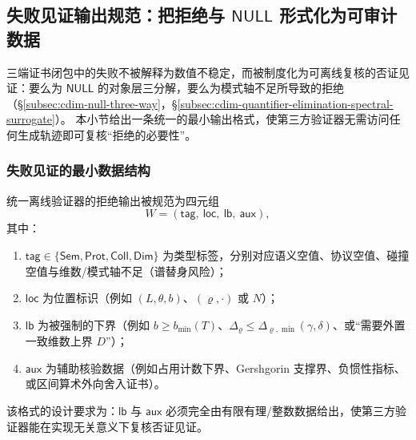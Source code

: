\subsection{失败见证输出规范：把拒绝与 \texorpdfstring{$\mathsf{NULL}$}{NULL} 形式化为可审计数据}\label{subsec:cdim-failure-witness-output-format}
三端证书闭包中的失败不被解释为数值不稳定，而被制度化为可离线复核的否证见证：要么为 \(\mathsf{NULL}\) 的对象层三分解，要么为模式轴不足所导致的拒绝（\S\ref{subsec:cdim-null-three-way}，\S\ref{subsec:cdim-quantifier-elimination-spectral-surrogate}）。
本小节给出一条统一的最小输出格式，使第三方验证器无需访问任何生成轨迹即可复核“拒绝的必要性”。

\subsubsection{失败见证的最小数据结构}\label{subsubsec:cdim-failure-witness-min-structure}
统一离线验证器的拒绝输出被规范为四元组
\[
W=(\mathsf{tag},\ \mathsf{loc},\ \mathsf{lb},\ \mathsf{aux}),
\]
其中：
\begin{enumerate}
  \item \(\mathsf{tag}\in\{\mathsf{Sem},\mathsf{Prot},\mathsf{Coll},\mathsf{Dim}\}\) 为类型标签，分别对应语义空值、协议空值、碰撞空值与维数/模式轴不足（谱替身风险）；
  \item \(\mathsf{loc}\) 为位置标识（例如 \((L,\theta,b)\)、\((\varrho,\cdot)\) 或 \(N\)）；
  \item \(\mathsf{lb}\) 为被强制的下界（例如 \(b\ge b_{\min}(T)\)、\(\Delta_{\varrho}\le \Delta_{\varrho,\min}(\gamma,\delta)\)、或“需要外置一致维数上界 \(D\)”）；
  \item \(\mathsf{aux}\) 为辅助核验数据（例如占用计数下界、Gershgorin 支撑界、负惯性指标、或区间算术外向舍入证书）。
\end{enumerate}
该格式的设计要求为：\(\mathsf{lb}\) 与 \(\mathsf{aux}\) 必须完全由有限有理/整数数据给出，使第三方验证器能在实现无关意义下复核否证见证。

